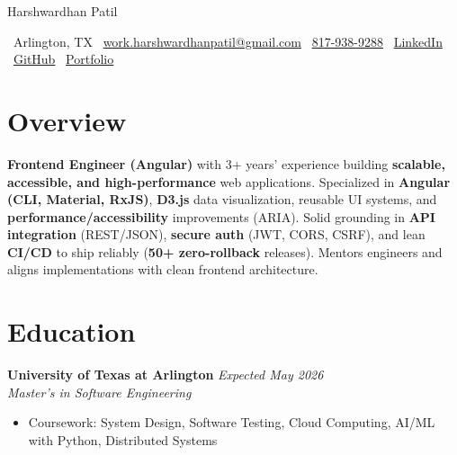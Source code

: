 \documentclass[10pt, letterpaper]{article}
\newenvironment{highlights}{\begin{itemize}[topsep=0.08 cm, parsep=0.06 cm, partopsep=0pt, itemsep=2pt, leftmargin=10pt]}{\end{itemize}}
\begin{document}
\newcommand{\AND}{\unskip\cleaders\copy\ANDbox\hskip\wd\ANDbox\ignorespaces}
\newsavebox\ANDbox
\sbox\ANDbox{$|$}

\begin{center}
    {\fontsize{25 pt}{25 pt}\selectfont Harshwardhan Patil}

    \vspace{10 pt}
    \normalsize
    \faMapMarker*\ Arlington, TX\hspace{1.2em}
    \faEnvelope\ \href{mailto:work.harshwardhanpatil@gmail.com}{work.harshwardhanpatil@gmail.com}\hspace{1.2em}
    \faPhone\ \href{tel:8179389288}{817-938-9288}\hspace{1.2em}
    \faLinkedin\ \href{https://www.linkedin.com/in/harshwardhanpatil23/}{LinkedIn}\hspace{1.2em}
    \faGithub\ \href{https://github.com/buffden}{GitHub}\hspace{1.2em}
    \faGlobe\ \href{https://buffden.github.io/buffden-portfolio/}{Portfolio}
\end{center}

\vspace{0.1 cm}

\newcommand{\educationentry}[4]{%
  \noindent\textbf{#1} \hfill \textit{#2}\\
  \textit{#3} \\
  #4
}

\section{Overview}
\textbf{Frontend Engineer (Angular)} with 3+ years’ experience building \textbf{scalable, accessible, and high-performance} web applications. Specialized in \textbf{Angular (CLI, Material, RxJS)}, \textbf{D3.js} data visualization, reusable UI systems, and \textbf{performance/accessibility} improvements (ARIA). Solid grounding in \textbf{API integration} (REST/JSON), \textbf{secure auth} (JWT, CORS, CSRF), and lean \textbf{CI/CD} to ship reliably (\textbf{50+ zero-rollback} releases). Mentors engineers and aligns implementations with clean frontend architecture.

\section{Education}
\educationentry
    {University of Texas at Arlington}
    {Expected May 2026}
    {Master’s in Software Engineering}
    {
    \begin{highlights}
        \item Coursework: System Design, Software Testing, Cloud Computing, AI/ML with Python, Distributed Systems
    \end{highlights}
    }
\end{document}
